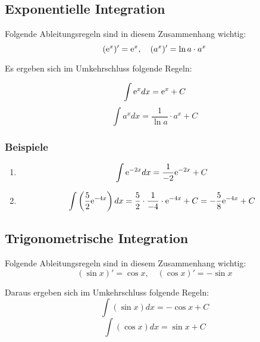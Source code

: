 \documentclass[12pt, a4paper]{report}
\begin{document}
\subsection{Exponentielle Integration}
Folgende Ableitungsregeln sind in diesem Zusammenhang wichtig:
\begin{equation}
({\rm e}^x)' = {\rm e}^x, \quad (a^x)' = \ln a \cdot a^x
\end{equation}

Es ergeben sich im Umkehrschluss folgende Regeln:

\begin{equation}
\int {\rm e}^xdx = {\rm e}^x + C
\end{equation}
\begin{equation}
\int a^xdx = \frac{1}{\ln a} \cdot a^x + C
\end{equation}

\subsubsection{Beispiele}

\begin{fleqn}[\parindent]
\begin{enumerate}
\item
\begin{align*}
\int {\rm e}^{-2x}dx = \frac{1}{-2}{\rm e}^{-2x} + C
\end{align*}
\item
\begin{align*}
\int \left(\frac{5}{2}{\rm e}^{-4x}\right)dx = \frac{5}{2}\cdot \frac{1}{-4} \cdot {\rm e}^{-4x} + C = -\frac{5}{8}{\rm e}^{-4x} + C
\end{align*}
\end{enumerate}
\end{fleqn}

\subsection{Trigonometrische Integration}
Folgende Ableitungsregeln sind in diesem Zusammenhang wichtig:
\begin{equation}
(\sin x)' = \cos x, \quad (\cos x)' = -\sin x
\end{equation}

Daraus ergeben sich im Umkehrschluss folgende Regeln:
\begin{equation}
\int (\sin x)dx = -\cos x + C
\end{equation}
\begin{equation}
\int (\cos x) dx = \sin x +C
\end{equation}
\end{document}
